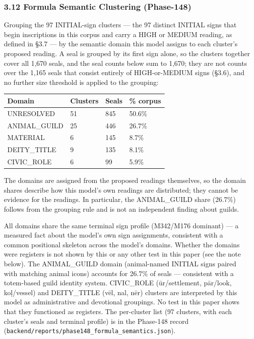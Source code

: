 \documentclass[
]{article}
\newcounter{none} %
\begin{document}
\subsubsection{3.12 Formula Semantic Clustering
(Phase-148)}\label{formula-semantic-clustering-phase-148}

Grouping the 97 INITIAL-sign clusters --- the 97 distinct INITIAL signs that begin inscriptions in this corpus and carry a HIGH or MEDIUM reading, as defined in §3.7 --- by the semantic domain this model assigns to each cluster's proposed reading. A seal is grouped by its first sign alone, so the clusters together cover all 1,670 seals, and the seal counts below sum to 1,670; they are not counts over the 1,165 seals that consist entirely of HIGH-or-MEDIUM signs (§3.6), and no further size threshold is applied to the grouping:

{\def\LTcaptype{none} %
\begin{longtable}[]{@{}llll@{}}
\toprule\noalign{}
Domain & Clusters & Seals & \% corpus \\
\midrule\noalign{}
\endhead
\bottomrule\noalign{}
\endlastfoot
UNRESOLVED & 51 & 845 & 50.6\% \\
ANIMAL\_GUILD & 25 & 446 & 26.7\% \\
MATERIAL & 6 & 145 & 8.7\% \\
DEITY\_TITLE & 9 & 135 & 8.1\% \\
CIVIC\_ROLE & 6 & 99 & 5.9\% \\ \end{longtable} }

The domains are assigned from the proposed readings themselves, so the domain shares describe how this model's own readings are distributed; they cannot be evidence for the readings. In particular, the ANIMAL\_GUILD share (26.7\%) follows from the grouping rule and is not an independent finding about guilds.

All domains share the same terminal sign profile (M342/M176 dominant) --- a measured fact about the model's own sign assignments, consistent with a common positional skeleton across the model's domains. Whether the domains were registers is not shown by this or any other test in this paper (see the note below). The
ANIMAL\_GUILD domain (animal-named INITIAL signs paired with matching
animal icons) accounts for 26.7\% of seals --- consistent with a
totem-based guild identity system. CIVIC\_ROLE (ūr/settlement, pār/look, koḷ/vessel) and DEITY\_TITLE (vēl, nal, nēr) clusters are interpreted by this model as administrative and devotional groupings. No test in this paper shows that they functioned as registers. The per-cluster list (97 clusters, with each cluster's seals and terminal profile) is in the Phase-148 record (\texttt{backend/reports/phase148\_formula\_semantics.json}).
\end{document}
